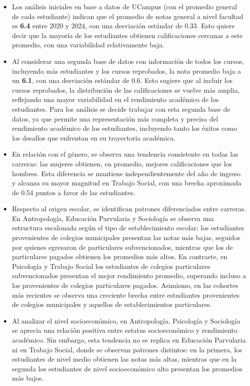 \documentclass[
  spanish,
  a4paper,
  oneside]{scrbook}
\begin{document}
\begin{itemize}
\item
  Los análisis iniciales en base a datos de UCampus (con el promedio
  general de cada estudiante) indican que el promedio de notas general a
  nivel facultad es \textbf{6.4} entre 2020 y 2024, con una desviación
  estándar de 0.33. Esto quiere decir que la mayoría de los estudiantes
  obtienen calificaciones cercanas a este promedio, con una variabilidad
  relativamente baja.
\item
  Al considerar una segunda base de datos con información de todos los
  cursos, incluyendo más estudiantes y los cursos reprobados, la nota
  promedio baja a un \textbf{6.1}, con una desviación estándar de 0.6.
  Esto sugiere que al incluir los cursos reprobados, la distribución de
  las calificaciones se vuelve más amplia, reflejando una mayor
  variabilidad en el rendimiento académico de los estudiantes. Para los
  análisis se decide trabajar con esta segunda base de datos, ya que
  permite una representación más completa y precisa del rendimiento
  académico de los estudiantes, incluyendo tanto los éxitos como los
  desafíos que enfrentan en su trayectoria académica.
\item
  En relación con el género, se observa una tendencia consistente en
  todas las carreras: las mujeres obtienen, en promedio, mejores
  calificaciones que los hombres. Esta diferencia se mantiene
  independientemente del año de ingreso y alcanza su mayor magnitud en
  Trabajo Social, con una brecha aproximada de 0.54 puntos a favor de
  las estudiantes.
\item
  Respecto al origen escolar, se identifican patrones diferenciados
  entre carreras. En Antropología, Educación Parvularia y Sociología se
  observa una estructura escalonada según el tipo de establecimiento
  escolar: los estudiantes provenientes de colegios municipales
  presentan las notas más bajas, seguidos por quienes egresaron de
  particulares subvencionados, mientras que los de particulares pagados
  obtienen los promedios más altos. En contraste, en Psicología y
  Trabajo Social los estudiantes de colegios particulares subvencionados
  presentan el mejor rendimiento promedio, superando incluso a los
  provenientes de colegios particulares pagados. Asimismo, en las
  cohortes más recientes se observa una creciente brecha entre
  estudiantes provenientes de colegios municipales y aquellos de
  establecimientos particulares.
\item
  Al analizar el nivel socioeconómico, en Antropología, Psicología y
  Sociología se aprecia una relación positiva entre estatus
  socioeconómico y rendimiento académico. Sin embargo, esta tendencia no
  se replica en Educación Parvularia ni en Trabajo Social, donde se
  observan patrones distintos: en la primera, los estudiantes de nivel
  medio obtienen las notas más altas, mientras que en la segunda los
  estudiantes de nivel socioeconómico alto presentan los promedios más
  bajos.
\end{itemize}
\end{document}
